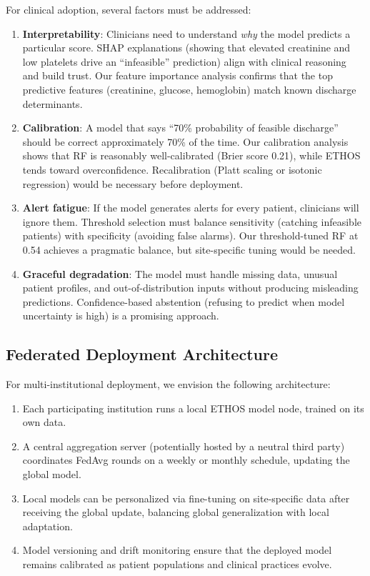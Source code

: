 For clinical adoption, several factors must be addressed:

\begin{enumerate}
\item \textbf{Interpretability}: Clinicians need to understand \emph{why} the model predicts a particular score. SHAP explanations (showing that elevated creatinine and low platelets drive an ``infeasible'' prediction) align with clinical reasoning and build trust. Our feature importance analysis confirms that the top predictive features (creatinine, glucose, hemoglobin) match known discharge determinants.

\item \textbf{Calibration}: A model that says ``70\% probability of feasible discharge'' should be correct approximately 70\% of the time. Our calibration analysis shows that RF is reasonably well-calibrated (Brier score 0.21), while ETHOS tends toward overconfidence. Recalibration (Platt scaling or isotonic regression) would be necessary before deployment.

\item \textbf{Alert fatigue}: If the model generates alerts for every patient, clinicians will ignore them. Threshold selection must balance sensitivity (catching infeasible patients) with specificity (avoiding false alarms). Our threshold-tuned RF at 0.54 achieves a pragmatic balance, but site-specific tuning would be needed.

\item \textbf{Graceful degradation}: The model must handle missing data, unusual patient profiles, and out-of-distribution inputs without producing misleading predictions. Confidence-based abstention (refusing to predict when model uncertainty is high) is a promising approach.
\end{enumerate}

\subsection{Federated Deployment Architecture}

For multi-institutional deployment, we envision the following architecture:

\begin{enumerate}
\item Each participating institution runs a local ETHOS model node, trained on its own data.
\item A central aggregation server (potentially hosted by a neutral third party) coordinates FedAvg rounds on a weekly or monthly schedule, updating the global model.
\item Local models can be personalized via fine-tuning on site-specific data after receiving the global update, balancing global generalization with local adaptation.
\item Model versioning and drift monitoring ensure that the deployed model remains calibrated as patient populations and clinical practices evolve.
\end{enumerate}

